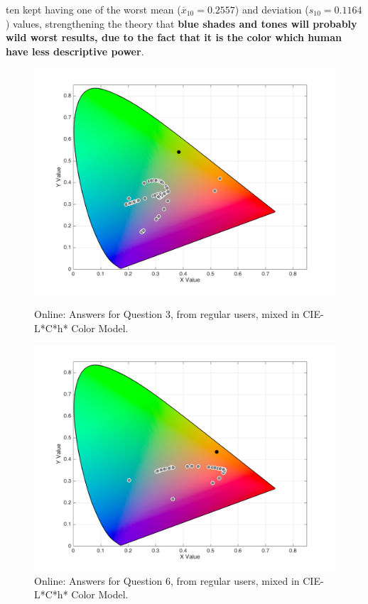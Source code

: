 ten kept having one of the worst mean ($\overline{x}_{10} = 0.2557$) and deviation ($s_{10} = 0.1164$) values, strengthening the theory that \textbf{blue shades and tones will probably wild worst results, due to the fact
that it is the color which human have less descriptive power}. \par
%
\begin{figure}[!htbp]
  \centering
  \vspace{-15pt}
  \begin{minipage}{0.48\textwidth}
    \centering
    \includegraphics[width=\textwidth]{images/results/3_online_LChresponses.png}
    \caption[Online: Answers for Question 3, from regular users, mixed in CIE-L*C*h* Color Model.]{Online: Answers for Question 3, from regular users, mixed in CIE-L*C*h* Color Model.}
    \label{fig:onlinelchregular_3}
  \end{minipage}\hfill
  \begin{minipage}{0.48\textwidth}
    \centering
    \includegraphics[width=\textwidth]{images/results/6_online_LChresponses.png}
    \caption[Online: Answers for Question 6, from regular users, mixed in CIE-L*C*h* Color Model.]{Online: Answers for Question 6, from regular users, mixed in CIE-L*C*h* Color Model.}
    \label{fig:onlinelchregular_6}
  \end{minipage}
  \vspace{-5pt}
\end{figure}
